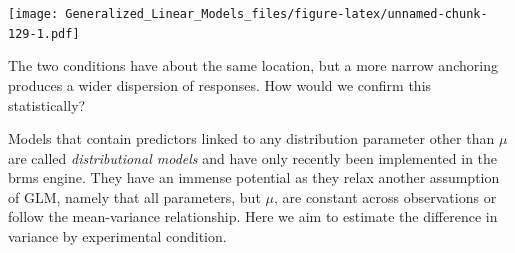 \documentclass[]{svmono}
\newenvironment{Shaded}{\begin{snugshade}}{\end{snugshade}}
\newcommand{\KeywordTok}[1]{\textcolor[rgb]{0.13,0.29,0.53}{\textbf{#1}}}
\newcommand{\DataTypeTok}[1]{\textcolor[rgb]{0.13,0.29,0.53}{#1}}
\newcommand{\DecValTok}[1]{\textcolor[rgb]{0.00,0.00,0.81}{#1}}
\newcommand{\StringTok}[1]{\textcolor[rgb]{0.31,0.60,0.02}{#1}}
\newcommand{\OperatorTok}[1]{\textcolor[rgb]{0.81,0.36,0.00}{\textbf{#1}}}
\newcommand{\NormalTok}[1]{#1}
\theoremstyle{definition}
\theoremstyle{definition}
\theoremstyle{definition}
\theoremstyle{remark}
\begin{document}
\begin{Shaded}
\end{Shaded}

\texttt{[image: Generalized\_Linear\_Models\_files/figure-latex/unnamed-chunk-129-1.pdf]}

The two conditions have about the same location, but a more narrow
anchoring produces a wider dispersion of responses. How would we confirm
this statistically?

Models that contain predictors linked to any distribution parameter
other than \(\mu\) are called \emph{distributional models} and have only
recently been implemented in the brms engine. They have an immense
potential as they relax another assumption of GLM, namely that all
parameters, but \(\mu\), are constant across observations or follow the
mean-variance relationship. Here we aim to estimate the difference in
variance by experimental condition.
\end{document}
